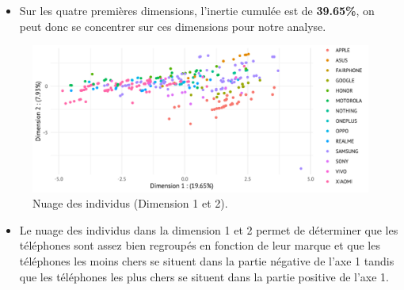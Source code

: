 \documentclass[
  12pt,
]{report}
\providecommand{\tightlist}{%
  \setlength{\itemsep}{0pt}\setlength{\parskip}{0pt}}\usepackage{longtable,booktabs,array}
\begin{document}
\begin{itemize}
\tightlist
\item
  Sur les quatre premières dimensions, l'inertie cumulée est de
  \textbf{39.65\%}, on peut donc se concentrer sur ces dimensions pour
  notre analyse.
\end{itemize}

\begin{figure}[H]

{\centering \includegraphics{report_files/figure-pdf/unnamed-chunk-10-1.pdf}

}

\caption{Nuage des individus (Dimension 1 et 2).}

\end{figure}%

\begin{itemize}
\tightlist
\item
  Le nuage des individus dans la dimension 1 et 2 permet de déterminer
  que les téléphones sont assez bien regroupés en fonction de leur
  marque et que les téléphones les moins chers se situent dans la partie
  négative de l'axe 1 tandis que les téléphones les plus chers se
  situent dans la partie positive de l'axe 1.
\end{itemize}

\newpage
\end{document}
